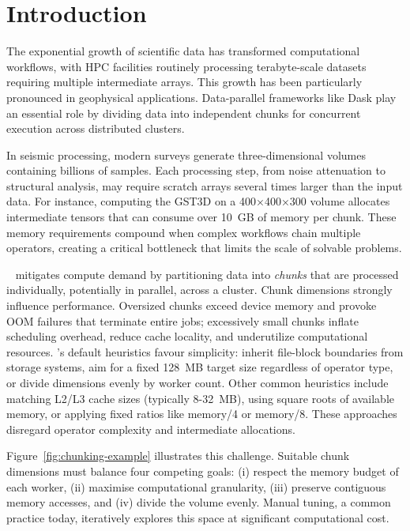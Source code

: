 \section{Introduction}
\label{sec:introduction}

The exponential growth of scientific data has transformed computational workflows, with \ac{HPC} facilities routinely processing terabyte-scale datasets requiring multiple intermediate arrays.
This growth has been particularly pronounced in geophysical applications.
Data-parallel frameworks like Dask play an essential role by dividing data into independent chunks for concurrent execution across distributed clusters.

In seismic processing, modern surveys generate three-dimensional volumes containing billions of samples.
Each processing step, from noise attenuation to structural analysis, may require scratch arrays several times larger than the input data.
For instance, computing the \ac{GST3D} on a 400×400×300 volume allocates intermediate tensors that can consume over 10~GB of memory per chunk.
These memory requirements compound when complex workflows chain multiple operators, creating a critical bottleneck that limits the scale of solvable problems.

\dask~\cite{rocklin2015dask} mitigates compute demand by partitioning data into \emph{chunks} that are processed individually, potentially in parallel, across a cluster.
Chunk dimensions strongly influence performance.
Oversized chunks exceed device memory and provoke \ac{OOM} failures that terminate entire jobs; excessively small chunks inflate scheduling overhead, reduce cache locality, and underutilize computational resources.
\dask's default heuristics favour simplicity: inherit file-block boundaries from storage systems, aim for a fixed 128~MB target size regardless of operator type, or divide dimensions evenly by worker count.
Other common heuristics include matching L2/L3 cache sizes (typically 8-32~MB), using square roots of available memory, or applying fixed ratios like memory/4 or memory/8.
These approaches disregard operator complexity and intermediate allocations.

Figure~\ref{fig:chunking-example} illustrates this challenge.
Suitable chunk dimensions must balance four competing goals: (i) respect the memory budget of each worker, (ii) maximise computational granularity, (iii) preserve contiguous memory accesses, and (iv) divide the volume evenly.
Manual tuning, a common practice today, iteratively explores this space at significant computational cost.

